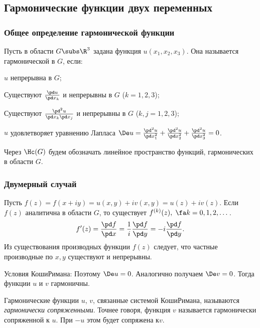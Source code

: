 \documentclass[a4paper]{article}
\begin{document}
\begin{theorem}
\subsection{Гармонические функции двух переменных}

\subsubsection{Общее определение гармонической функции}

Пусть в области $G\subs\R^3$ задана функция $u(x_1,x_2,x_3)$. Она называется гармонической в $G$,  если:
\begin{points}{-1}
\item $u$ непрерывна в $G$;
\item
 Существуют $\frac{\pd u}{\pd x_k}$ и непрерывны в $G$ ($k=1,2,3$);
\item
 Существуют $\frac{\pd^2u}{\pd x_k\pd x_j}$ и непрерывны в $G$ ($k,j=1,2,3$);
\item
 $u$ удовлетворяет уравнению Лапласа
 $\De u=\frac{\pd^2 u}{\pd x_1^2}+\frac{\pd^2 u}{\pd x_2^2}+\frac{\pd^2 u}{\pd x_3^2}
 =0$.
\end{points}

Через $\Hc(G)$ будем обозначать линейное пространство функций, гармонических  в области $G$.

\subsubsection{Двумерный случай}

Пусть $f(z)=f(x+iy)=u(x,y)+iv(x,y)=u(z)+iv(z)$.
Если $f(z)$ аналитична в области $G$,  то существует
$f^{(k)}(z),\;\fa k=0,1,2,\dots$.
$$
  f'(z)=\frac{\pd f}{\pd x}=\frac1i \frac{\pd f}{\pd y}=-i\frac{\pd f}{\pd y}.
$$
Из существования производных функции $f(z)$ следует, что частные производные
по $x,y$ существуют и непрерывны.

Условия Коши\ч Римана:
Поэтому $\De u=0$. Аналогично получаем $\De v=0$. Тогда  функции $u$ и $v$ гармоничны.

\begin{df}
Гармонические функции $u$, $v$, связанные системой Коши\ч Римана, называются \emph{гармонически сопряженными}.
Точнее говоря, функция $v$ называется гармонически сопряженной к $u$. При $-u$ этом будет сопряжена к$v$.
\end{df}


\end{theorem}
\end{document}
